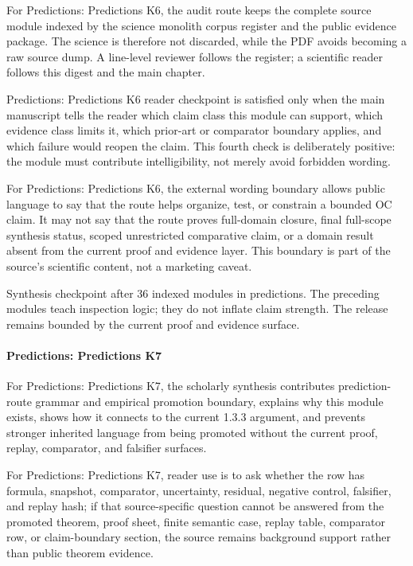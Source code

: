 For Predictions: Predictions K6, the audit route keeps the complete source module indexed by the science monolith corpus register and the public evidence package. The science is therefore not discarded, while the PDF avoids becoming a raw source dump. A line-level reviewer follows the register; a scientific reader follows this digest and the main chapter.


Predictions: Predictions K6 reader checkpoint is satisfied only when the main manuscript tells the reader which claim class this module can support, which evidence class limits it, which prior-art or comparator boundary applies, and which failure would reopen the claim. This fourth check is deliberately positive: the module must contribute intelligibility, not merely avoid forbidden wording.


For Predictions: Predictions K6, the external wording boundary allows public language to say that the route helps organize, test, or constrain a bounded OC claim. It may not say that the route proves full-domain closure, final full-scope synthesis status, scoped unrestricted comparative claim, or a domain result absent from the current proof and evidence layer. This boundary is part of the source's scientific content, not a marketing caveat.


Synthesis checkpoint after 36 indexed modules in predictions. The preceding modules teach inspection logic; they do not inflate claim strength. The release remains bounded by the current proof and evidence surface.


\paragraph{Predictions: Predictions K7}

For Predictions: Predictions K7, the scholarly synthesis contributes prediction-route grammar and empirical promotion boundary, explains why this module exists, shows how it connects to the current 1.3.3 argument, and prevents stronger inherited language from being promoted without the current proof, replay, comparator, and falsifier surfaces.


For Predictions: Predictions K7, reader use is to ask whether the row has formula, snapshot, comparator, uncertainty, residual, negative control, falsifier, and replay hash; if that source-specific question cannot be answered from the promoted theorem, proof sheet, finite semantic case, replay table, comparator row, or claim-boundary section, the source remains background support rather than public theorem evidence.


